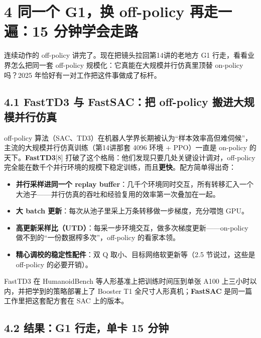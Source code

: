 \documentclass[
  chinese,
]{ctexart}
\providecommand{\tightlist}{%
  \setlength{\itemsep}{0pt}\setlength{\parskip}{0pt}}
\begin{document}
\section{4 同一个 G1，换 off-policy 再走一遍：15
分钟学会走路}\label{ux540cux4e00ux4e2a-g1ux6362-off-policy-ux518dux8d70ux4e00ux904d15-ux5206ux949fux5b66ux4f1aux8d70ux8def}

连续动作的 off-policy 讲完了。现在把镜头拉回第14讲的老地方 G1
行走，看看业界怎么把同一套 off-policy
规模化：它真能在大规模并行仿真里顶替 on-policy 吗？2025
年恰好有一对工作把这件事做成了标杆。

\subsection{4.1 FastTD3 与 FastSAC：把 off-policy
搬进大规模并行仿真}\label{fasttd3-ux4e0e-fastsacux628a-off-policy-ux642cux8fdbux5927ux89c4ux6a21ux5e76ux884cux4effux771f}

off-policy
算法（SAC、TD3）在机器人学界长期被认为``样本效率高但难伺候''，主流的大规模并行仿真训练（第14讲那套
4096 环境 + PPO）一直是 on-policy 的天下。\textbf{FastTD3}{[}8{]}
打破了这个格局：他们发现只要几处关键设计调对，off-policy
完全能在数千个并行环境的规模下稳定训练，而且\textbf{更快}。配方简单得出奇：

\begin{itemize}
\tightlist
\item
  \textbf{并行采样进同一个 replay
  buffer}：几千个环境同时交互，所有转移汇入一个大池子------并行仿真的吞吐和经验复用的效率第一次叠加在一起。
\item
  \textbf{大 batch 更新}：每次从池子里采上万条转移做一步梯度，充分喂饱
  GPU。
\item
  \textbf{高更新采样比（UTD）}：每采一步环境交互，做多次梯度更新------on-policy
  做不到的``一份数据榨多次''，off-policy 的看家本领。
\item
  \textbf{精心调校的稳定性配件}：双 Q 取小、目标网络软更新等（2.5
  节说过，这些是 off-policy 的必要开销）。
\end{itemize}

FastTD3 在 HumanoidBench 等人形基准上把训练时间压到单张 A100
上三小时以内，并把学到的策略部署上了 Booster T1
全尺寸人形真机；\textbf{FastSAC} 是同一篇工作里把这套配方套在 SAC
上的版本。

\subsection{4.2 结果：G1 行走，单卡 15
分钟}\label{ux7ed3ux679cg1-ux884cux8d70ux5355ux5361-15-ux5206ux949f}
\end{document}
